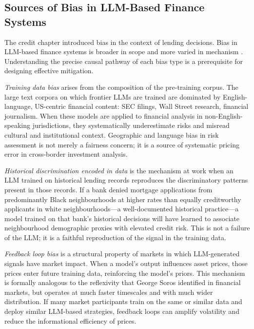 \begin{context}

\subsection{Sources of Bias in LLM-Based Finance Systems}
\label{subsec:af-ethics-sources}

The credit chapter introduced bias in the context of lending decisions. Bias in LLM-based finance systems is broader in scope and more varied in mechanism \cite{mehrabi2021survey}. Understanding the precise causal pathway of each bias type is a prerequisite for designing effective mitigation.

\emph{Training data bias} arises from the composition of the pre-training corpus. The large text corpora on which frontier LLMs are trained are dominated by English-language, US-centric financial content: SEC filings, Wall Street research, financial journalism. When these models are applied to financial analysis in non-English-speaking jurisdictions, they systematically underestimate risks and misread cultural and institutional context. Geographic and language bias in risk assessment is not merely a fairness concern; it is a source of systematic pricing error in cross-border investment analysis.

\emph{Historical discrimination encoded in data} is the mechanism at work when an LLM trained on historical lending records reproduces the discriminatory patterns present in those records. If a bank denied mortgage applications from predominantly Black neighbourhoods at higher rates than equally creditworthy applicants in white neighbourhoods---a well-documented historical practice---a model trained on that bank's historical decisions will have learned to associate neighbourhood demographic proxies with elevated credit risk. This is not a failure of the LLM; it is a faithful reproduction of the signal in the training data.

\emph{Feedback loop bias} is a structural property of markets in which LLM-generated signals have market impact. When a model's output influences asset prices, those prices enter future training data, reinforcing the model's priors. This mechanism is formally analogous to the reflexivity that George Soros identified in financial markets, but operates at much faster timescales and with much wider distribution. If many market participants train on the same or similar data and deploy similar LLM-based strategies, feedback loops can amplify volatility and reduce the informational efficiency of prices.


\end{context}
